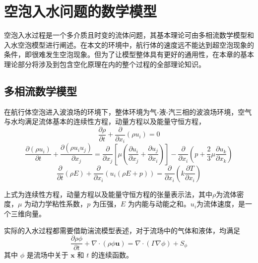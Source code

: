 \chapter{空泡入水问题的数学模型}
空泡入水过程是一个多介质且时变的流体问题，其基本理论可由多相流数学模型和入水空泡模型进行阐述。在本文的环境中，航行体的速度远不能达到超空泡现象的条件，即很难发生空泡现象。但为了让模型整体具有更好的通用性，在本章的基本理论部分将涉及到包含空化原理在内的整个过程的全部理论知识。

\section{多相流数学模型}
在航行体空泡进入波浪场的环境下，整体环境为气-液-汽三相的波浪场环境，空气与水均满足流体基本的连续性方程，动量方程以及能量守恒方程，
\begin{equation}
  \frac {\partial \rho}{\partial t} + \frac {\partial}{\partial x_i} (\rho u_i) = 0
\end{equation}
\begin{equation}
  \frac {\partial (\rho u_i)}{\partial t} + \frac {\partial (\rho u_i u_j)}{\partial x_j} = \frac {\partial}{\partial x_j} \left[ \mu \left( \frac {\partial u_i}{\partial x_j} + \frac {\partial u_j}{\partial x_i} \right) \right] - \frac {\partial}{\partial x_i} \left( p + \frac 2 3 \mu \frac {\partial u_k}{\partial x_k} \right)
\end{equation}
\begin{equation}
  \frac \partial {\partial t} (\rho E) + \frac \partial {\partial x_i} \left( u_i (\rho E + p) \right) = \frac \partial {\partial x_i} \left( k \frac {\partial T}{\partial x_i} \right)
\end{equation}

上式为连续性方程，动量方程以及能量守恒方程的张量表示法，其中$\rho$为流体密度，$\mu$ 为动力学粘性系数，$p$ 为压强，$E$ 为内能与动能之和。$u_i$为流体速度，是一个三维向量。

实际的入水过程都需要借助湍流模型表述\cite{Kliafas1987}，对于流场中的气体和液体，均满足
\begin{equation}
  \frac {\partial \rho \phi}{\partial t} + \nabla \cdot (\rho \phi \mathbf u) = \nabla \cdot (\Gamma \nabla \phi) + S_{\phi}
\end{equation}
其中 $\phi$ 是流场中关于 $\mathbf x$ 和 $t$ 的连续函数。

